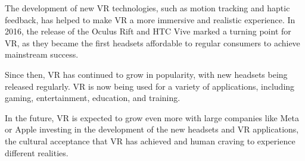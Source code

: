 The development of new VR technologies, such as motion tracking and haptic feedback, has helped to make VR a more immersive and realistic experience. In 2016, the release of the Oculus Rift and HTC Vive marked a turning point for VR, as they became the first headsets affordable to regular consumers to achieve mainstream success.

Since then, VR has continued to grow in popularity, with new headsets being released regularly. VR is now being used for a variety of applications, including gaming, entertainment, education, and training.

In the future, VR is expected to grow even more with large companies like Meta or Apple investing in the development of the new headsets and VR applications, the cultural acceptance that VR has achieved and human craving to experience different realities.